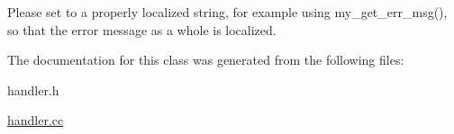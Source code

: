 Please set to a properly localized string, for example using my\+\_\+get\+\_\+err\+\_\+msg(), so that the error message as a whole is localized. 

The documentation for this class was generated from the following files\+:\begin{DoxyCompactItemize}
\item 
handler.\+h\item 
\mbox{\hyperlink{handler_8cc}{handler.\+cc}}\end{DoxyCompactItemize}
